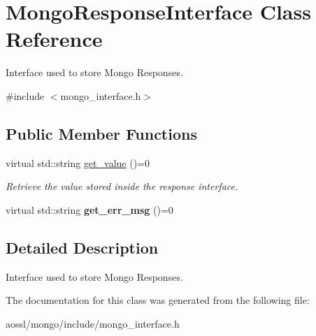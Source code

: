 \hypertarget{classMongoResponseInterface}{}\section{Mongo\+Response\+Interface Class Reference}
\label{classMongoResponseInterface}


Interface used to store Mongo Responses.  




{\ttfamily \#include $<$mongo\+\_\+interface.\+h$>$}

\subsection*{Public Member Functions}
\begin{DoxyCompactItemize}
\item 
virtual std\+::string \hyperlink{classMongoResponseInterface_a99ee074490255bdbffd3489dedccb568}{get\+\_\+value} ()=0\hypertarget{classMongoResponseInterface_a99ee074490255bdbffd3489dedccb568}{}\label{classMongoResponseInterface_a99ee074490255bdbffd3489dedccb568}

\begin{DoxyCompactList}\small\item\em Retrieve the value stored inside the response interface. \end{DoxyCompactList}\item 
virtual std\+::string {\bfseries get\+\_\+err\+\_\+msg} ()=0\hypertarget{classMongoResponseInterface_a4227dedc086f453b18a840d03e6ec659}{}\label{classMongoResponseInterface_a4227dedc086f453b18a840d03e6ec659}

\end{DoxyCompactItemize}


\subsection{Detailed Description}
Interface used to store Mongo Responses. 

The documentation for this class was generated from the following file\+:\begin{DoxyCompactItemize}
\item 
aossl/mongo/include/mongo\+\_\+interface.\+h\end{DoxyCompactItemize}
